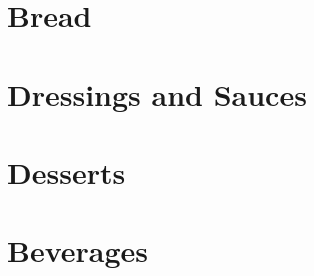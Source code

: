 \documentclass[%
letter,
11pt
]{article}
\begin{document}
\section{Bread}










\section{Dressings and Sauces}





\section{Desserts}










\section{Beverages}







\end{document}
